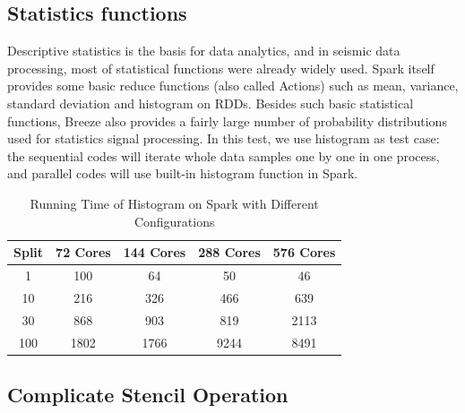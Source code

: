 \subsection{Statistics functions}
Descriptive statistics is the basis for data analytics, and in seismic data processing, most of statistical functions were already widely used. Spark itself provides some basic reduce functions (also called Actions) such as mean, variance, standard deviation and histogram on RDDs. Besides such basic statistical functions, Breeze also provides a fairly large number of probability distributions used for statistics signal processing. In this test, we use histogram as test case: the sequential codes will iterate whole data samples one by one in one process, and parallel codes will use built-in histogram function in Spark.


\begin{table}[H]
\caption{Running Time of Histogram on Spark with Different Configurations}
\centering
\begin{tabular}{||c| c c c c ||} 
 \hline
 Split & 72 Cores & 144 Cores & 288 Cores & 576 Cores \\ 
 \hline
  1 & 100 &	64 & 50 & 46 \\
  10 & 216 &	326 & 466 & 639 \\
  30 & 868 &	903 & 819 & 2113 \\
  100 & 1802 & 1766 & 9244 & 8491 \\
 \hline
\end{tabular}
\label{table:HistSpark}
\end{table}

\subsection{Complicate Stencil Operation}

